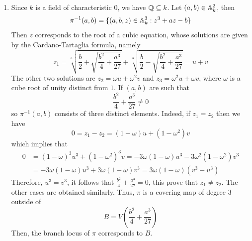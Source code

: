 \documentclass{article}
\begin{document}
\begin{enumerate}
    \item[(c)] Since $k$ is a field of characteristic $0$, we have $\mathbb{Q}\subseteq k$. Let 
    $(a,b)\in\mathbb{A}_{k}^{2}$, then
    \begin{equation*}
        \pi^{-1}(a,b)=\{(a,b,z)\in\mathbb{A}_{k}^{3}:z^{3}+az-b\}
    \end{equation*}
    Then $z$ corresponds to the root of a cubic equation, whose solutions are given by the 
    Cardano-Tartaglia formula, namely
    \begin{equation*}
        z_{1}=\sqrt[3]{\frac{b}{2}+\sqrt{\frac{b^{2}}{4}+\frac{a^{3}}{27}}}
        +\sqrt[3]{\frac{b}{2}-\sqrt{\frac{b^{2}}{4}+\frac{a^{3}}{27}}}=u+v
    \end{equation*}
    The other two solutions are $z_{2}=\omega u+\omega^{2} v$ and $z_{3}=\omega^{2} u+\omega v$,
    where $\omega$ is a cube root of unity distinct from $1$. If $(a,b)$ are such that
    \begin{equation*}
        \frac{b^{2}}{4}+\frac{a^{3}}{27}\neq0
    \end{equation*}
    so $\pi^{-1}(a,b)$ consists of three distinct elements. Indeed, if $z_{1}=z_{2}$ then we have
    \begin{equation*}
        0=z_{1}-z_{2}=(1-\omega)u+(1-\omega^{2})v
    \end{equation*}
    which implies that
    \begin{align*}
        0 &= (1-\omega)^{3}u^{3}+(1-\omega^{2})^{3}v
        =-3\omega(1-\omega)u^{3}-3\omega^{2}(1-\omega^{2})v^{3} \\
        &= -3\omega(1-\omega)u^{3}+3\omega(1-\omega)v^{3}=3\omega(1-\omega)(v^{3}-u^{3})
    \end{align*}
    Therefore, $u^{3}=v^{3}$, it follows that $\frac{b^{2}}{4}+\frac{a^{3}}{27}=0$, this prove 
    that $z_{1}\neq z_{2}$. The other cases are obtained similarly. Thus, $\pi$ is a covering map
    of degree $3$ outside of
    \begin{equation*}
        B=V\left(\frac{b^{2}}{4}+\frac{a^{3}}{27}\right)
    \end{equation*}
    Then, the branch locus of $\pi$ corresponds to $B$.


\end{enumerate}
\end{document}
